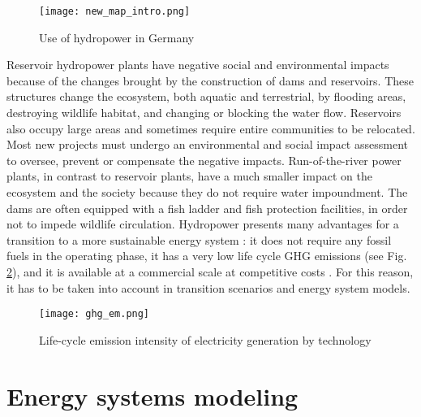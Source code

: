 \begin{figure}[H]
\centering
\texttt{[image: new\_map\_intro.png]}
\caption[Use of hydropower in Germany]{Use of hydropower in Germany}
\label{hp_de}
\end{figure}

Reservoir hydropower plants have negative social and environmental impacts because of the changes brought by the construction of dams and reservoirs. These structures change the ecosystem, both aquatic and terrestrial, by flooding areas, destroying wildlife habitat, and changing or blocking the water flow. Reservoirs also occupy large areas and sometimes require entire communities to be relocated. Most new projects must undergo an environmental and social impact assessment to oversee, prevent or compensate the negative impacts. Run-of-the-river power plants, in contrast to reservoir plants, have a much smaller impact on the ecosystem and the society because they do not require water impoundment. The dams are often equipped with a fish ladder and fish protection facilities, in order not to impede wildlife circulation. \newline 
Hydropower presents many advantages for a transition to a more sustainable energy system : it does not require any fossil fuels in the operating phase, it has a very low life cycle GHG emissions (see Fig. \ref{ghg_em}), and it is available at a commercial scale at competitive costs \cite{hp_europe}. For this reason, it has to be taken into account in transition scenarios and energy system models. 

\begin{figure}[H]
\centering
\texttt{[image: ghg\_em.png]}
\caption[Life-cycle emission intensity of electricity generation by technology]{Life-cycle emission intensity of electricity generation by technology \cite{hp_europe}}
\label{ghg_em}
\end{figure}


\section{Energy systems modeling}

